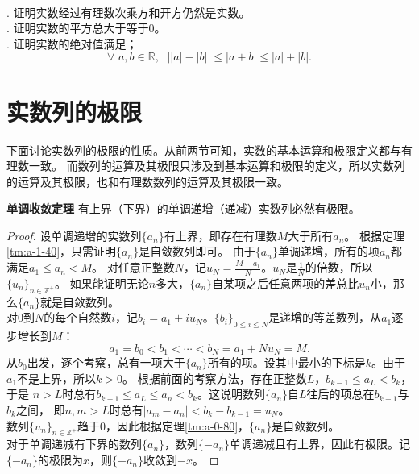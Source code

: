 \documentclass[12pt,UTF8]{ctexbook}
\begin{document}
\begin{appendix}
\begin{xt}
    \mbox{} \\
    . 证明实数经过有理数次乘方和开方仍然是实数。\\
    . 证明实数的平方总大于等于$0$。\\
    . 证明实数的绝对值满足；
    $$\forall \,\, a, b\in\mathbb{R}, \;\,\, \big||a| - |b|\big| \leqslant |a + b| \leqslant |a| + |b|.$$
\end{xt}

\section{实数列的极限}
下面讨论实数列的极限的性质。从前两节可知，实数的基本运算和极限定义都与有理数一致。
而数列的运算及其极限只涉及到基本运算和极限的定义，所以实数列的运算及其极限，也和有理数数列的运算及其极限一致。

\begin{tm}\textbf{单调收敛定理}\label{tm:a-2-10}
    有上界（下界）的单调递增（递减）实数列必然有极限。
\end{tm}
\begin{proof}
    设单调递增的实数列$\{a_n\}$有上界，即存在有理数$M$大于所有$a_n$。
    根据定理\ref{tm:a-1-40}，只需证明$\{a_n\}$是自敛数列即可。
    由于$\{a_n\}$单调递增，所有的项$a_n$都满足$a_1\leqslant a_n < M$。
    对任意正整数$N$，记$u_N = \frac{M - a_1}{N}$。$u_N$是$\frac{1}{N}$的倍数，所以$\{u_n\}_{n\in\mathbb{Z}^+}$。
    如果能证明无论$n$多大，$\{a_n\}$自某项之后任意两项的差总比$u_n$小，那么$\{a_n\}$就是自敛数列。\\
    对$0$到$N$的每个自然数$i$，记$b_i = a_1 + iu_N$。$\{b_i\}_{0\leqslant i\leqslant N}$是递增的等差数列，从$a_1$逐步增长到$M$：
    $$ a_1 = b_0 < b_1 < \cdots < b_N = a_1 + Nu_N = M.$$
    从$b_0$出发，逐个考察，总有一项大于$\{a_n\}$所有的项。设其中最小的下标是$k$。由于$a_1$不是上界，所以$k>0$。
    根据前面的考察方法，存在正整数$L$，$b_{k-1} \leqslant a_L < b_k$，于是
    $n>L$时总有$b_{k-1} \leqslant a_L \leqslant a_n < b_k$。这说明数列$\{a_n\}$自$L$往后的项总在$b_{k-1}$与$b_k$之间，
    即$n,m>L$时总有$|a_m - a_n| < b_k - b_{k-1} = u_N$。\\
    数列$\{u_n\}_{n\in\mathbb{Z}^+}$趋于$0$，因此根据定理\ref{tm:a-0-80}，$\{a_n\}$是自敛数列。\\
    对于单调递减有下界的数列$\{a_n\}$，数列$\{-a_n\}$单调递减且有上界，因此有极限。记$\{-a_n\}$的极限为$x$，则$\{-a_n\}$收敛到$-x$。
\end{proof}


\end{appendix}
\end{document}
